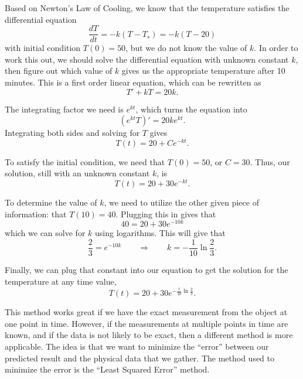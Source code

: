 \begin{exampleSol}
Based on Newton's Law of Cooling, we know that the temperature satisfies the differential equation
\begin{equation*}
\frac{dT}{dt} = -k(T - T_s) = -k(T - 20)
\end{equation*} 
with initial condition $T(0) = 50$, but we do not know the value of $k$. In order to work this out, we should solve the differential equation with unknown constant $k$, then figure out which value of $k$ gives us the appropriate temperature after 10 minutes. This is a first order linear equation, which can be rewritten as 
\begin{equation*}
T' + kT = 20k.
\end{equation*}

The integrating factor we need is $e^{kt}$, which turns the equation into
\begin{equation*}
(e^{kt}T)' = 20ke^{kt}.
\end{equation*}
Integrating both sides and solving for $T$ gives
\begin{equation*}
T(t) = 20 + Ce^{-kt}.
\end{equation*}

To satisfy the initial condition, we need that $T(0) = 50$, or $C = 30$. Thus, our solution, still with an unknown constant $k$, is
\begin{equation*}
T(t) = 20 + 30e^{-kt}.
\end{equation*}

To determine the value of $k$, we need to utilize the other given piece of information: that $T(10) = 40$. Plugging this in gives that
\begin{equation*}
40 = 20 + 30e^{-10k}
\end{equation*}
which we can solve for $k$ using logarithms. This will give that
\begin{equation*}
\frac{2}{3} = e^{-10k} \qquad \Rightarrow \qquad k = -\frac{1}{10} \ln{ \frac{2}{3}}.
\end{equation*}

Finally, we can plug that constant into our equation to get the solution for the temperature at any time value,
\begin{equation*}
T(t) = 20+30e^{-\frac{t}{10}\ln{\frac{2}{3}}}. 
\end{equation*}
\end{exampleSol} 

This method works great if we have the exact measurement from the object at one point in time. However, if the measurements at multiple points in time are known, and if the data is not likely to be exact, then a different method is more applicable. The idea is that we want to minimize the ``error'' between our predicted result and the physical data that we gather. The method used to minimize the error is the ``Least Squared Error'' method.

